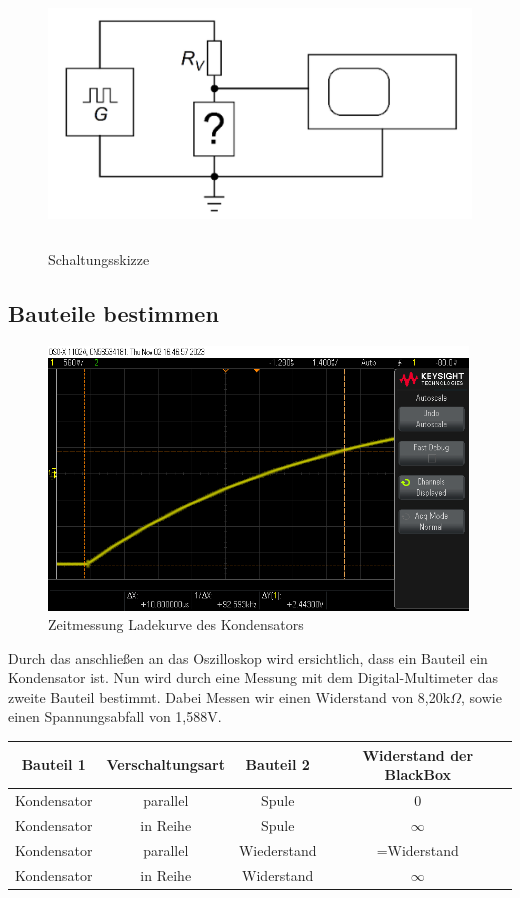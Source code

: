 \begin{figure}[H]
	\centering
	\includegraphics[height=7cm]{images/Versuch2/1_Schaltungsskizze.jpeg} 
	\caption{Schaltungsskizze}
	\label{fig: Schaltungsskizze}
\end{figure}

\subsection{Bauteile bestimmen}

\begin{figure}[H]
	\centering
	\includegraphics[height=7cm]{images/Versuch2/Zeitmessung_tau_10_8microsek.png} 
	\caption{Zeitmessung Ladekurve des Kondensators}
	\label{fig: Zeitmessung ladekurve des Kondensators}
\end{figure}

Durch das anschließen an das Oszilloskop wird ersichtlich, dass ein Bauteil ein 
Kondensator ist. Nun wird durch eine Messung mit dem Digital-Multimeter das zweite
Bauteil bestimmt. Dabei Messen wir einen Widerstand von 8,20k$\Omega$, sowie einen
Spannungsabfall von 1,588V. 

\begin{tabular}[h]{c|c|c|c}
    \textbf{Bauteil 1} & \textbf{Verschaltungsart} & \textbf{Bauteil 2} & \textbf{Widerstand der BlackBox}\\
    \hline
    Kondensator & parallel & Spule & 0 \\
    \hline
    Kondensator & in Reihe & Spule & $\infty$ \\
    \hline
    Kondensator & parallel & Wiederstand & =Widerstand \\
	\hline
	Kondensator & in Reihe & Widerstand & $\infty$ 
    \label{tab:Versuch 2: Bauteile bestimmen}
\end{tabular}

